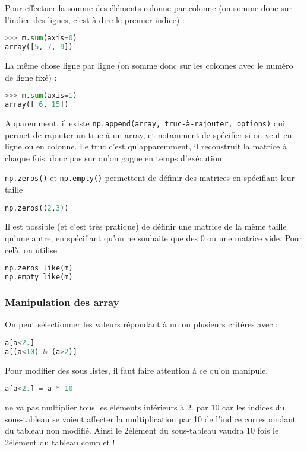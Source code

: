 \documentclass[a4paper,twoside]{article}
\begin{document}
Pour effectuer la somme des éléments colonne par colonne (on somme donc sur l'indice des lignes, c'est à dire le premier indice) :
\begin{lstlisting}[language=python]
>>> m.sum(axis=0)
array([5, 7, 9])
\end{lstlisting}

La même chose ligne par ligne (on somme donc sur les colonnes avec le numéro de ligne fixé) :
\begin{lstlisting}[language=python]
>>> m.sum(axis=1)
array([ 6, 15])
\end{lstlisting}

\begin{remarque}
Apparemment, il existe \texttt{np.append(array, truc-à-rajouter, options)} qui permet de rajouter un truc à un array, et notamment de spécifier si on veut en ligne ou en colonne. Le truc c'est qu'apparemment, il reconstruit la matrice à chaque fois, donc pas sur qu'on gagne en temps d'exécution.
\end{remarque}

\texttt{np.zeros()} et \texttt{np.empty()} permettent de définir des matrices en spécifiant leur taille
\begin{lstlisting}[language=python]
np.zeros((2,3))
\end{lstlisting}

Il est possible (et c'est très pratique) de définir une matrice de la même taille qu'une autre, en spécifiant qu'on ne souhaite que des 0 ou une matrice vide. Pour celà, on utilise
\begin{lstlisting}[language=python]
np.zeros_like(m)
np.empty_like(m)
\end{lstlisting}

\subsubsection{Manipulation des array}
On peut sélectionner les valeurs répondant à un ou plusieurs critères avec :
\begin{lstlisting}[language=python]
a[a<2.]
a[(a<10) & (a>2)]
\end{lstlisting}

Pour modifier des sous listes, il faut faire attention à ce qu'on manipule. 

\begin{lstlisting}[language=python]
a[a<2.] = a * 10
\end{lstlisting}
ne va pas multiplier tous les éléments inférieurs à $2.$ par $10$ car les indices du sous-tableau se voient affecter la multiplication par 10 de l'indice correspondant du tableau non modifié. Ainsi le 2\ieme élément du sous-tableau vaudra 10 fois le 2\ieme élément du tableau complet !
\end{document}
